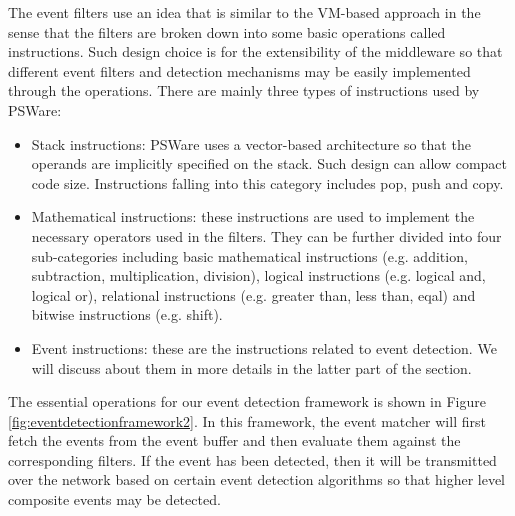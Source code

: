 The event filters use an idea that is similar to the VM-based approach \cite{mate} in the sense that the filters are broken down into some basic operations called instructions. Such design choice is for the extensibility of the middleware so that different event filters and detection mechanisms may be easily implemented through the operations. There are mainly three types of instructions used by PSWare:
\begin{itemize}
\item Stack instructions: PSWare uses a vector-based architecture so that the operands are implicitly specified on the stack. Such design can allow compact code size. Instructions falling into this category includes pop, push and copy.
\item Mathematical instructions: these instructions are used to implement the necessary operators used in the filters. They can be further divided into four sub-categories including basic mathematical instructions (e.g. addition, subtraction, multiplication, division), logical instructions (e.g. logical and, logical or), relational instructions (e.g. greater than, less than, eqal) and bitwise instructions (e.g. shift).
\item Event instructions: these are the instructions related to event detection. We will discuss about them in more details in the latter part of the section.
\end{itemize}

\begin{comment}
In addition to the filters, as shown in Figure \ref{fig:pswarevm}, each sensor node has an event buffer where the detected events may be stored for composite event detection.

\begin{figure}
\centering
\figurecurrentwidth{pswarevm}
\caption{PSWare runtime environment}
\label{fig:pswarevm}
\end{figure}
\end{comment}

The essential operations for our event detection framework is shown in Figure \ref{fig:eventdetectionframework2}. In this framework, the event matcher will first fetch the events from the event buffer and then evaluate them against the corresponding filters. If the event has been detected, then it will be transmitted over the network based on certain event detection algorithms so that higher level composite events may be detected.

